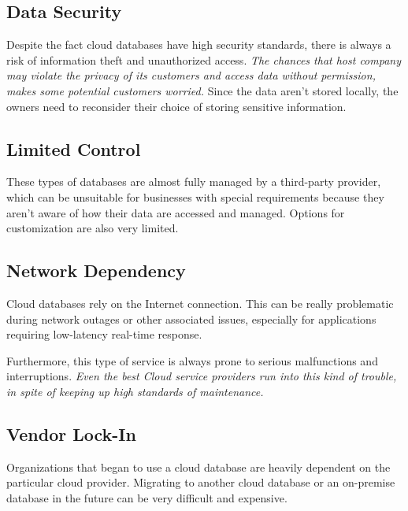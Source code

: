 \documentclass[12pt, a4paper]{article}
\begin{document}
    \subsection{Data Security}
        Despite the fact cloud databases have high security standards, there is always a risk of information theft and unauthorized access. \textit{The chances that host company may violate the privacy of its customers and access data without permission, makes some potential customers worried.}\cite{02} Since the data aren't stored locally, the owners need to reconsider their choice of storing sensitive information.

    \subsection{Limited Control}
        These types of databases are almost fully managed by a third-party provider, which can be unsuitable for businesses with special requirements because they aren't aware of how their data are accessed and managed. Options for customization are also very limited.
        
    \subsection{Network Dependency}
        Cloud databases rely on the Internet connection. This can be really problematic during network outages or other associated issues, especially for applications requiring low-latency real-time response.\par Furthermore, this type of service is always prone to serious malfunctions and interruptions. \textit{Even the best Cloud service providers run into this kind of trouble, in spite of keeping up high standards of maintenance.}\cite{14}
        
    \subsection{Vendor Lock-In}
        Organizations that began to use a cloud database are heavily dependent on the particular cloud provider. Migrating to another cloud database or an on-premise database in the future can be very difficult and expensive.
\end{document}
